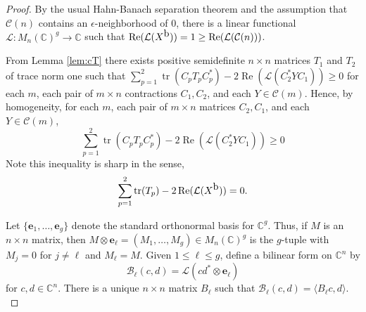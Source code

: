\documentclass[12pt,makeidx]{amsart}
\DeclareMathOperator{\tr}{tr}
\numberwithin{equation}{section}
\def\bbF{ {\mathbb C}}
\def\cB{ {\mathcal B} }
\def\cC{ {\mathcal C} }
\def\cL{ {\mathcal L} }
\def\Cr{C_1}
\def\Cl{C_2}
\def\oX{X^{\mbox{\rm{b}}}}
\def\be{\mathbf{e}}
\begin{document}
\begin{proof}
 By the usual Hahn-Banach separation theorem
 and the assumption that $\cC(n)$ contains
 an $\epsilon$-neighborhood of $0$,
 there is a linear functional $\cL: M_n(\bbF)^g \to \bbF$
 such that $\operatorname{Re}(\cL(\oX)) =  1 \ge  \operatorname{Re}(\cL(\cC(n)))$.
 
 From Lemma \ref{lem:cT} there exists positive semidefinite $n\times n$ matrices $T_1$ and $T_2$ of  trace norm one such that
$\sum_{p=1}^2 \tr(C_p T_p C_p^{\ast})- 2 \operatorname{Re}(\cL(\Cl^{\ast}Y\Cr)) \ge 0$  for each $m$, each pair of $m\times n$ contractions $\Cr,\Cl$, and each $Y\in\cC(m)$. Hence, by homogeneity,   for each $m$, each pair of $m\times n$ matrices $\Cl,\Cr$, and each $Y\in\cC(m)$,
\begin{equation}
\label{eq:absLMI}
 \sum_{p=1}^2 \tr(C_p T_p C_p^{\ast})- 2\operatorname{Re}(\cL(\Cl^{\ast}Y\Cr)) \ge 0
\end{equation}
 Note this inequality is sharp in the sense,
\begin{equation}
\label{eq:absLMI0}
\sum_{p=1}^2 \tr(T_p)- 2\operatorname{Re}(\cL(\oX)) = 0.
\end{equation}

 Let $\{\be_1,\dots,\be_g\}$ 
  denote the
 standard orthonormal basis for $\bbF^g.$ Thus, if $M$ is an $n\times n$ matrix, then $M\otimes \be_\ell=(M_1,\dots,M_g)\in M_n(\bbF)^g$ is the $g$-tuple with $M_j=0$ for $j\ne \ell$ and $M_\ell=M$. 
 Given $1\le \ell \le g$, define
 a bilinear form on $\bbF^n$ by
\[
  \cB_\ell(c,d)=\cL(cd^{\ast}\otimes \be_\ell)
\]
  for  $c,d\in\bbF^n$.
  There is a unique $n\times n$ matrix $B_\ell$  such that
$
  \cB_\ell(c,d)=\langle B_\ell c, d\rangle.
$





\end{proof}
\end{document}
